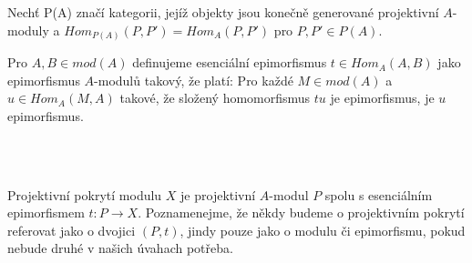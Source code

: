      \begin{dfn}       
       \begin{description} \item
         \item[(a)] Nechť P(A) značí kategorii, jejíž objekty jsou konečně generované 
            projektivní $A$-moduly a $Hom_{P(A)}(P,P')=Hom_A(P,P')$ pro $P,P'\in P(A)$. 
         \item[(b)] Pro $A,B\in mod(A)$ definujeme esenciální epimorfismus $t\in Hom_A(A,B)$
           jako epimorfismus $A$-modulů takový, že platí: Pro každé $M\in mod(A)$ a 
           $u\in Hom_A(M,A)$ takové, že složený 
           homomorfismus $tu$ je epimorfismus, je $u$ epimorfismus.  
           \\\\      
           \centerline{}\\
         \item[(c)] Projektivní pokrytí modulu $X$ je projektivní $A$-modul $P$ 
           spolu s esenciálním epimorfismem $t:P\rightarrow X$. Poznamenejme, že 
           někdy budeme o projektivním pokrytí referovat jako o dvojici 
           $(P,t)$, jindy pouze jako o modulu či epimorfismu, pokud nebude druhé 
           v našich úvahach potřeba.
       \end{description}       
     \end{dfn}
     
